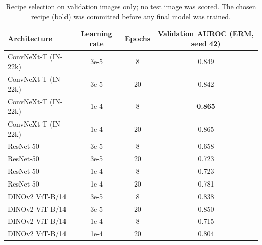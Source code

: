 \begin{table}[H]\centering\scriptsize
\caption{Recipe selection on validation images only; no test image was scored. The chosen recipe (bold) was committed before any final model was trained.}\label{tab:s16recipe}
\begin{tabular}{lccc}\toprule
Architecture & Learning rate & Epochs & Validation AUROC (ERM, seed 42) \\\midrule
ConvNeXt-T (IN-22k) & 3e-5 & 8 & 0.849 \\
ConvNeXt-T (IN-22k) & 3e-5 & 20 & 0.842 \\
ConvNeXt-T (IN-22k) & 1e-4 & 8 & \textbf{0.865} \\
ConvNeXt-T (IN-22k) & 1e-4 & 20 & 0.865 \\
ResNet-50 & 3e-5 & 8 & 0.658 \\
ResNet-50 & 3e-5 & 20 & 0.723 \\
ResNet-50 & 1e-4 & 8 & 0.723 \\
ResNet-50 & 1e-4 & 20 & 0.781 \\
DINOv2 ViT-B/14 & 3e-5 & 8 & 0.838 \\
DINOv2 ViT-B/14 & 3e-5 & 20 & 0.850 \\
DINOv2 ViT-B/14 & 1e-4 & 8 & 0.715 \\
DINOv2 ViT-B/14 & 1e-4 & 20 & 0.804 \\
\bottomrule\end{tabular}
\end{table}
